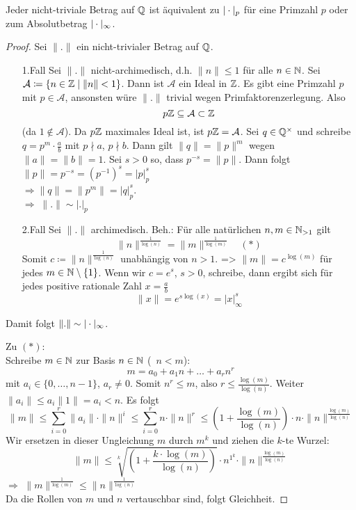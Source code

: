 \documentclass[../main.tex]{subfiles}
\begin{document}
\begin{theorem}
    Jeder nicht-triviale Betrag auf $\mathbb{Q}$ ist äquivalent zu $|\cdot|_p$ für eine Primzahl $p$ oder zum Absolutbetrag $|\cdot|_\infty$.
\end{theorem}
\begin{proof}
    Sei $\|.\|$ ein nicht-trivialer Betrag auf $\mathbb{Q}$.
    \begin{itemize}
        \item[1.Fall]
        Sei $\|.\|$ nicht-archimedisch, d.h. $\|n\|\leq 1$ für alle $n\in \mathbb{N}$.
        Sei $\mathcal{A}\coloneqq \{n\in \mathbb{Z}\mid \|n\| <1\}$.
        Dann ist $\mathcal{A}$ ein Ideal in $\mathbb{Z}$.
        Es gibt eine Primzahl $p$ mit $p\in \mathcal{A}$, ansonsten würe $\|.\|$ trivial wegen Primfaktorenzerlegung. Also
        $$p\mathbb{Z}\subseteq\mathcal{A}\subset \mathbb{Z}$$ (da $1\notin \mathcal{A}$).
        Da $p\mathbb{Z}$ maximales Ideal ist, ist $p\mathbb{Z} = \mathcal{A}$.
        Sei $q\in \mathbb{Q}^\times$ und schreibe $q=p^m\cdot \frac{a}{b}$ mit $p\nmid a$, $p\nmid b$.
        Dann gilt $\|q\| = \|p\|^m$ wegen $\|a\| = \|b\| =1$.
        Sei $s>0$ so, dass $p^{-s} = \|p\|$.
        Dann folgt $\|p\| =p^{-s} = (p^{-1})^s= |p|_p^s$\\
        $\Longrightarrow\|q\| = \|p^m\| = |q|_p^s$.\\
        $\Longrightarrow\;\|.\| \sim |.|_p$

        \item[2.Fall]
        Sei $\|.\|$ archimedisch.
        Beh.: Für alle natürlichen $n,m\in\mathbb{N}_{>1}$ gilt
        $$\|n\|^{\frac{1}{\log(n)}} = \|m\|^{\frac{1}{\log(m)}}\quad (*)$$
        Somit $c\coloneqq\|n\|^{\frac{1}{\log(n)}}$ unabhängig von $n>1$.
        => $\|m\| = c^{\log(m)}$ für jedes $m\in \mathbb{N}\setminus\{1\}$.
        Wenn wir $c = e^s$, $s>0$, schreibe, dann ergibt sich für jedes positive rationale Zahl $x=\frac{a}{b}$
        $$\|x\| = e^{s\log(x)} = |x|_\infty^s$$
    \end{itemize}
    Damit folgt $\|.\|\sim |\cdot|_\infty$.

    Zu $(*)$:\\
    Schreibe $m\in \mathbb{N}$ zur Basis $n\in\mathbb{N}$ (\obda\ $n<m$):
    $$m= a_0 + a_1 n+\dots+a_rn^r$$
    mit $a_i\in \{0,\dots,n-1\}$, $a_r \neq 0$.
    Somit $n^r\leq m$, also $r\leq \frac{\log(m)}{\log(n)}$.
    Weiter $\|a_i\| \leq a_i \|1\| = a_i<n$.
    Es folgt $$\|m\|\leq \sum_{i=0}^r \|a_i\| \cdot \|n\|^i\leq \sum_{i=0}^r n \cdot \|n\|^r \leq \left(1+\frac{\log(m)}{\log(n)}\right) \cdot n \cdot \|n\|^{\frac{\log(m)}{\log(n)}}$$
    Wir ersetzen in dieser Ungleichung $m$ durch $m^k$ und ziehen die $k$-te Wurzel:
    $$\|m\| \leq \sqrt[k]{\left(1+\frac{k\cdot\log(m)}{\log(n)}\right)}\cdot n^{1^k} \cdot \|n\|^{\frac{\log(m)}{\log(n)}}$$
    $\Longrightarrow$ $\|m\|^{\frac{1}{\log(m)}} \leq \|n\|^{\frac{1}{\log(n)}}$\\
    Da die Rollen von $m$ und $n$ vertauschbar sind, folgt Gleichheit.
\end{proof}
\end{document}
